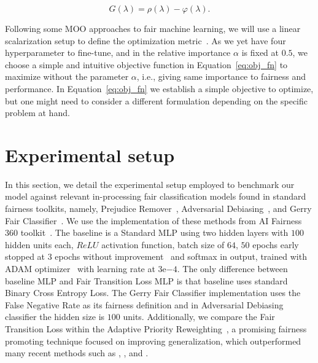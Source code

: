 \begin{equation} \label{eq:obj_fn}
    G(\lambda) = \rho(\lambda) - \varphi(\lambda).
\end{equation}

Following some MOO approaches to fair machine learning, we will use a linear scalarization setup to define the optimization metric~\citep{Schmucker2020,Petrovic2021}. As we yet have four hyperparameter to fine-tune, and in \cite{Cruz2021} the relative importance $\alpha$ is fixed at $0.5$, we choose a simple and intuitive objective function in Equation~\ref{eq:obj_fn} to maximize without the parameter $\alpha$, i.e., giving same importance to fairness and performance. In Equation~\ref{eq:obj_fn} we establish a simple objective to optimize, but one might need to consider a different formulation depending on the specific problem at hand.


\section{Experimental setup} \label{sec:experimental}

In this section, we detail the experimental setup employed to benchmark our model against relevant in-processing fair classification models found in standard fairness toolkits, namely, Prejudice Remover~\citep{Kamishima2012}, Adversarial Debiasing~\citep{Zhang2018}, and Gerry Fair Classifier~\citep{kearns18a}. We use the implementation of these methods from AI Fairness 360 toolkit~\citep{aif360-oct-2018}. The baseline is a Standard MLP using two hidden layers with $100$ hidden units each, $ReLU$ activation function, batch size of $64$, $50$ epochs early stopped at $3$ epochs without improvement~\citep{Li2020} and softmax in output, trained with ADAM optimizer~\citep{KingmaB14} with learning rate at $3\mathrm{e}{-4}$. The only difference between baseline MLP and Fair Transition Loss MLP is that baseline uses standard Binary Cross Entropy Loss. The Gerry Fair Classifier implementation uses the False Negative Rate as its fairness definition and in Adversarial Debiasing classifier the hidden size is $100$ units. Additionally, we compare the Fair Transition Loss within the Adaptive Priority Reweighting~\cite{HuXT23}, a promising fairness promoting technique focused on improving generalization, which outperformed many recent methods such as \cite{jiang2020identifying}, \cite{mroueh2021fair}, and \cite{roh2020fairbatch}.

